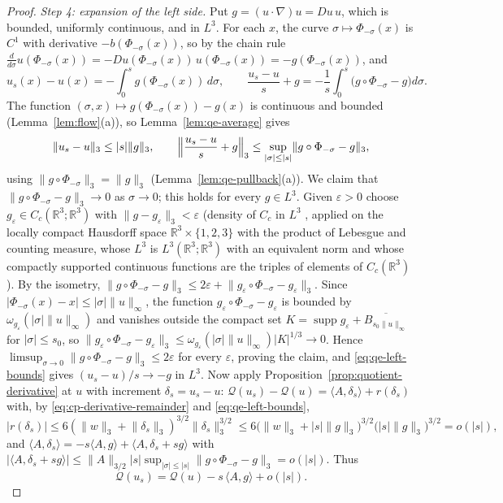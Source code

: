 \documentclass[11pt]{article}
\theoremstyle{definition}
\theoremstyle{plain}
\newcommand{\R}{\mathbb R}
\newcommand{\norm}[1]{\lVert #1\rVert}
\begin{document}
\begin{proof}
\emph{Step 4: expansion of the left side.}  Put $g=(u\cdot\nabla)u=Du\,u$,
which is bounded, uniformly continuous, and in $L^3$.  For each $x$, the
curve $\sigma\mapsto\Phi_{-\sigma}(x)$ is $C^1$ with derivative
$-b(\Phi_{-\sigma}(x))$, so by the chain rule
$\frac d{d\sigma}u(\Phi_{-\sigma}(x))=-Du(\Phi_{-\sigma}(x))\,u(\Phi_{-\sigma}(x))=-g(\Phi_{-\sigma}(x))$,
and
\[
 u_s(x)-u(x)=-\int_0^sg(\Phi_{-\sigma}(x))\,d\sigma,
 \qquad
 \frac{u_s-u}s+g=-\frac1s\int_0^s\bigl(g\circ\Phi_{-\sigma}-g\bigr)d\sigma .
\]
The function $(\sigma,x)\mapsto g(\Phi_{-\sigma}(x))-g(x)$ is continuous
and bounded (Lemma~\ref{lem:flow}(a)), so Lemma~\ref{lem:qe-average}
gives
\begin{equation}\label{eq:qe-left-bounds}
 \norm{u_s-u}_3\le|s|\norm g_3,
 \qquad
 \Bigl\|\frac{u_s-u}s+g\Bigr\|_3\le\sup_{|\sigma|\le|s|}\norm{g\circ\Phi_{-\sigma}-g}_3 ,
\end{equation}
using $\norm{g\circ\Phi_{-\sigma}}_3=\norm g_3$ (Lemma~\ref{lem:qe-pullback}(a)).
We claim that $\norm{g\circ\Phi_{-\sigma}-g}_3\to0$ as $\sigma\to0$; this
holds for every $g\in L^3$.  Given $\varepsilon>0$ choose
$g_\varepsilon\in C_c(\R^3;\R^3)$ with $\norm{g-g_\varepsilon}_3<\varepsilon$
(density of $C_c$ in $L^3$
\cite[Thm.~3.14]{Rudin1987}, applied on
the locally compact Hausdorff space $\R^3\times\{1,2,3\}$ with the
product of Lebesgue and counting measure, whose $L^3$ is
$L^3(\R^3;\R^3)$ with an equivalent norm and whose compactly
supported continuous functions are the triples of elements of
$C_c(\R^3)$).  By the isometry,
$\norm{g\circ\Phi_{-\sigma}-g}_3\le2\varepsilon+\norm{g_\varepsilon\circ\Phi_{-\sigma}-g_\varepsilon}_3$.
Since $|\Phi_{-\sigma}(x)-x|\le|\sigma|\norm u_\infty$, the function
$g_\varepsilon\circ\Phi_{-\sigma}-g_\varepsilon$ is bounded by
$\omega_{g_\varepsilon}(|\sigma|\norm u_\infty)$ and vanishes outside the
compact set $K=\operatorname{supp}g_\varepsilon+\overline{B_{s_0\norm u_\infty}}$
for $|\sigma|\le s_0$, so
$\norm{g_\varepsilon\circ\Phi_{-\sigma}-g_\varepsilon}_3
\le\omega_{g_\varepsilon}(|\sigma|\norm u_\infty)|K|^{1/3}\to0$.  Hence
$\limsup_{\sigma\to0}\norm{g\circ\Phi_{-\sigma}-g}_3\le2\varepsilon$ for
every $\varepsilon$, proving the claim, and \eqref{eq:qe-left-bounds}
gives $(u_s-u)/s\to-g$ in $L^3$.  Now apply
Proposition~\ref{prop:quotient-derivative} at $u$ with increment
$\delta_s=u_s-u$: $\mathcal Q(u_s)-\mathcal Q(u)=\langle A,\delta_s\rangle+r(\delta_s)$
with, by \eqref{eq:cp-derivative-remainder} and \eqref{eq:qe-left-bounds},
\[
 |r(\delta_s)|\le6(\norm w_3+\norm{\delta_s}_3)^{3/2}\norm{\delta_s}_3^{3/2}
 \le6\bigl(\norm w_3+|s|\norm g_3\bigr)^{3/2}\bigl(|s|\norm g_3\bigr)^{3/2}=o(|s|),
\]
and $\langle A,\delta_s\rangle=-s\langle A,g\rangle+\langle A,\delta_s+sg\rangle$
with $|\langle A,\delta_s+sg\rangle|\le\norm A_{3/2}|s|\sup_{|\sigma|\le|s|}\norm{g\circ\Phi_{-\sigma}-g}_3=o(|s|)$.
Thus
\begin{equation}\label{eq:qe-left-expansion}
 \mathcal Q(u_s)=\mathcal Q(u)-s\,\langle A,g\rangle+o(|s|).
\end{equation}


\end{proof}
\end{document}

